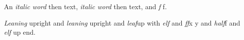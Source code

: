 \documentclass{article}
\begin{document}
An \textit{italic word\nocorr} then text, \textit{italic word} then text, and \textit{f\nocorr} f.

\textit{Leaning} \textup{\nocorr upright} and \textit{leaning} \textup{upright} and \textit{leaf}\textup{\nocorr up\nocorr} with
\textit{elf}\textbf{\nocorr} and \textit{ff}\textup{x {y\nocorr}} and \textsl{half\nocorr}\textup{\nocorr f} and \textit{elf}\textup{ \nocorr up} end.
\end{document}
